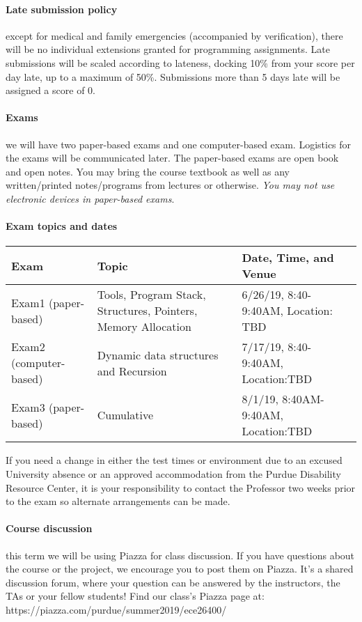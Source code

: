 \documentclass{article}
\begin{document}
\paragraph{Late submission policy} except for medical and family emergencies (accompanied by verification), there will be no individual extensions granted for programming assignments. Late submissions will be scaled according to lateness, docking 10\% from your score per day late, up to a maximum of 50\%. Submissions more than 5 days late will be assigned a score of 0.

\paragraph{Exams} we will have two paper-based exams and one computer-based exam. Logistics for the exams will be communicated later.
The paper-based exams are open book and open notes. You may bring the course textbook as well as any written/printed notes/programs from lectures or otherwise. {\em You may not use electronic devices in paper-based exams}.

\paragraph{Exam topics and dates}
\begin{table}[H]
\centering
\begin{tabulary}{\linewidth}{|l|p{70mm}|p{40mm}|}\hline
Exam & Topic & Date, Time, and Venue \\ \hline
Exam1 (paper-based) & Tools, Program Stack, Structures, Pointers, Memory Allocation &  6/26/19, 8:40-9:40AM, Location: TBD \\ \hline
Exam2 (computer-based) & Dynamic data structures and Recursion & 7/17/19, 8:40-9:40AM, Location:TBD \\ \hline
Exam3 (paper-based) & Cumulative & 8/1/19, 8:40AM-9:40AM, Location:TBD \\
\hline
\end{tabulary}
\end{table}

If you need a change in either the test times or environment due to an excused University absence or an approved accommodation from the Purdue Disability Resource Center, it is your responsibility to contact the Professor two weeks prior to the exam so alternate arrangements can be made. 

\paragraph{Course discussion} this term we will be using Piazza for class discussion. If you have questions about the course or the project, we encourage you to post them on Piazza. It's a shared discussion forum, where your question can be answered by the instructors, the TAs or your fellow students! Find our class's Piazza page at: https://piazza.com/purdue/summer2019/ece26400/
\end{document}

